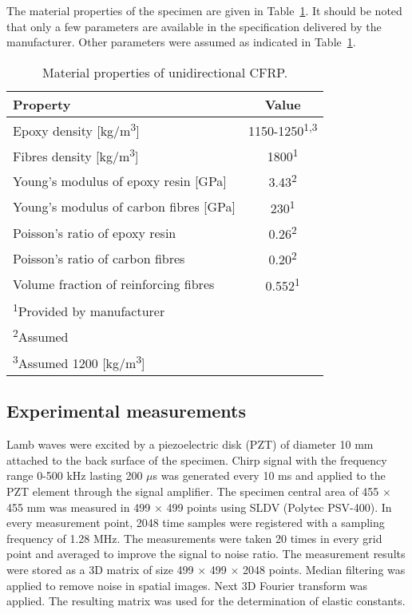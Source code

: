 \documentclass[preprint,12pt]{elsarticle}
\begin{document}
The material properties of the specimen are given in Table~\ref{tab:mat_prop_uni}. 
It should be noted that only a few parameters are available in the specification delivered by the manufacturer. 
Other parameters were assumed as indicated in Table~\ref{tab:mat_prop_uni}.

\begin{table}[h]
	\renewcommand{\arraystretch}{1.3}
	\centering \footnotesize
	\caption{Material properties of unidirectional CFRP.}
	\begin{tabular}{lc} 
		\toprule
		Property & Value \\
		\midrule
		Epoxy density [kg/m\textsuperscript{3}]& 1150-1250\textsuperscript{1,3} \\ 
		Fibres density [kg/m\textsuperscript{3}]& 1800\textsuperscript{1}\\ 
		Young’s modulus of epoxy resin [GPa] & 3.43\textsuperscript{2}\\
		Young’s modulus of carbon fibres [GPa] & 230\textsuperscript{1}\\
		Poisson’s ratio of epoxy resin & 0.26\textsuperscript{2}\\
		Poisson’s ratio of carbon fibres & 0.20\textsuperscript{2} \\
		Volume fraction of reinforcing fibres & 0.552\textsuperscript{1}\\
		\bottomrule 
		\textsuperscript{1}Provided by manufacturer &\\
		\textsuperscript{2}Assumed &\\
		\textsuperscript{3}Assumed 1200 [kg/m\textsuperscript{3}]&\\
	\end{tabular} 
	\label{tab:mat_prop_uni}
\end{table}

\subsection{Experimental measurements \label{sec:SLDV}}
Lamb waves were excited by a piezoelectric disk (PZT) of diameter 10 mm attached to the back surface of the specimen. 
Chirp signal with the frequency range 0-500 kHz lasting 200 $\mu$s was generated every 10 ms and applied to the PZT element through the signal amplifier.
The specimen central area of 455 $\times$ 455 mm was measured in 499 $\times$ 499 points using SLDV (Polytec PSV-400). 
In every measurement point, 2048 time samples were registered with a sampling frequency of 1.28 MHz. The measurements were taken 20 times in every grid point and averaged to improve the signal to noise ratio.
The measurement results were stored as a 3D matrix of size 499 $\times$ 499 $\times$ 2048 points. 
Median filtering was applied to remove noise in spatial images. Next 3D Fourier transform was applied. 
The resulting matrix was used for the determination of elastic constants.
\end{document}

